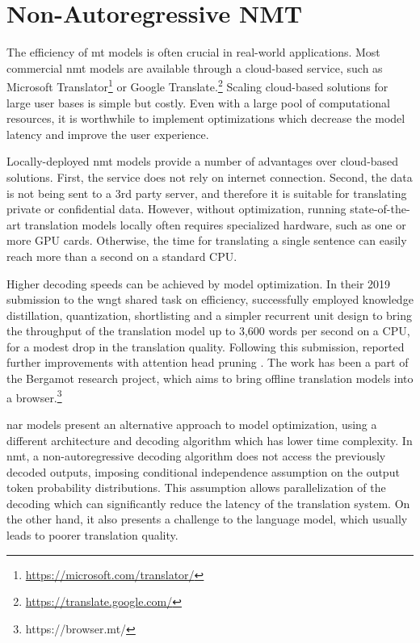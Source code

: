 \chapter{Non-Autoregressive NMT}
\label{chap:nat}

The efficiency of \ac{mt} models is often crucial in real-world applications.
Most commercial \ac{nmt} models are available through a cloud-based service,
such as Microsoft Translator\footnote{\url{https://microsoft.com/translator/}}
or Google Translate.\footnote{\url{https://translate.google.com/}} Scaling
cloud-based solutions for large user bases is simple but costly. Even with a
large pool of computational resources, it is worthwhile to implement
optimizations which decrease the model latency and improve the user experience.

Locally-deployed \ac{nmt} models provide a number of advantages over
cloud-based solutions. First, the service does not rely on internet
connection. Second, the data is not being sent to a 3rd party server, and
therefore it is suitable for translating private or confidential data.
However, without optimization, running state-of-the-art translation models
locally often requires specialized hardware, such as one or more GPU
cards. Otherwise, the time for translating a single sentence can easily reach
more than a second on a standard CPU.

Higher decoding speeds can be achieved by model optimization. In their 2019
submission to the \ac{wngt} shared task on efficiency,
\citet{kim-etal-2019-research} successfully employed knowledge distillation,
quantization, shortlisting \citep{jean-etal-2015-using} and a simpler recurrent
unit design to bring the throughput of the translation model up to 3,600 words
per second on a CPU, for a modest drop in the translation quality. Following
this submission, \citet{bogoychev-etal-2020-edinburghs} reported further
improvements with attention head pruning \citep{voita-etal-2019-analyzing}. The
work has been a part of the Bergamot research project, which aims to bring
offline translation models into a browser.\footnote{https://browser.mt/}

\Ac{nar} models present an alternative approach to model optimization, using a
different architecture and decoding algorithm which has lower time complexity.
In \ac{nmt}, a non-autoregressive decoding algorithm does not access the
previously decoded outputs, imposing conditional independence assumption on the
output token probability distributions. This assumption allows parallelization
of the decoding which can significantly reduce the latency of the translation
system. On the other hand, it also presents a challenge to the language model,
which usually leads to poorer translation quality.

